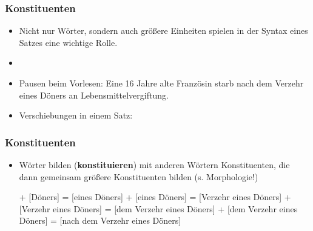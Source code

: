 \begin{frame}
\frametitle{Konstituenten}

\begin{itemize}
	\item Nicht nur Wörter, sondern auch größere Einheiten spielen in der Syntax eines Satzes eine wichtige Rolle.
	\item[]
	\item Pausen beim Vorlesen:
	\ea Eine 16 Jahre alte Französin starb nach dem Verzehr eines Döners an Lebensmittelvergiftung.
	\z
	
\pause	
	\item Verschiebungen in einem Satz:
	\eal 
	\zl


\end{itemize}

\end{frame}


\begin{frame}
\frametitle{Konstituenten}

\begin{itemize}
	\item Wörter bilden (\textbf{konstituieren}) mit anderen Wörtern Konstituenten, die dann gemeinsam größere Konstituenten bilden (s. Morphologie!)
	
	\eal
	\ex [eines] + [Döners] = [eines Döners]
\pause	
	\ex [Verzehr] + [eines Döners] = [Verzehr eines Döners]
\pause
	\ex [dem] + [Verzehr eines Döners] = [dem Verzehr eines Döners]
\pause
	\ex [nach] + [dem Verzehr eines Döners] = [nach dem Verzehr eines Döners]
	\zl

\end{itemize}

\end{frame}


